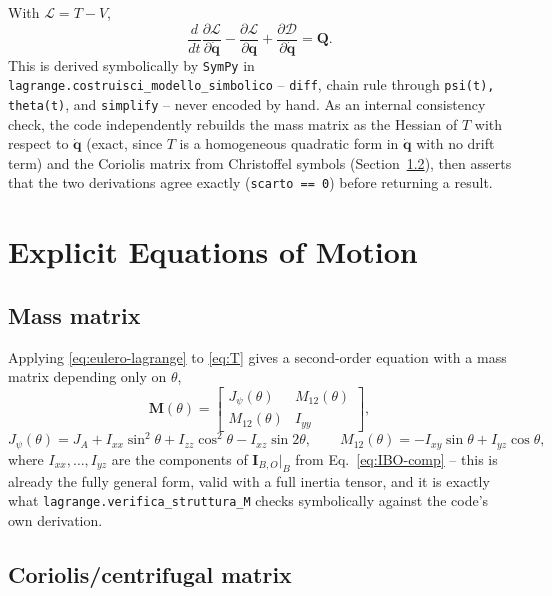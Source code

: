 \documentclass[11pt,a4paper]{article}
\numberwithin{equation}{section}
\newcommand{\bs}[1]{\boldsymbol{#1}}
\begin{document}
With $\mathcal L = T - V$,
\begin{equation}
\frac{d}{dt}\frac{\partial\mathcal L}{\partial\dot{\bs q}} - \frac{\partial\mathcal L}{\partial\bs q} + \frac{\partial\mathcal D}{\partial\dot{\bs q}} = \bs Q .
\label{eq:eulero-lagrange}
\end{equation}
This is derived symbolically by \texttt{SymPy} in \texttt{lagrange.\allowbreak costruisci\_\allowbreak modello\_\allowbreak simbolico} -- \texttt{diff}, chain rule through \texttt{psi(t), theta(t)}, and \texttt{simplify} -- never encoded by hand. As an internal consistency check, the code independently rebuilds the mass matrix as the Hessian of $T$ with respect to $\dot{\bs q}$ (exact, since $T$ is a homogeneous quadratic form in $\dot{\bs q}$ with no drift term) and the Coriolis matrix from Christoffel symbols (Section~\ref{subsec:christoffel}), then asserts that the two derivations agree exactly (\texttt{scarto == 0}) before returning a result.

\section{Explicit Equations of Motion}
\label{sec:eom}

\subsection{Mass matrix}

Applying \eqref{eq:eulero-lagrange} to \eqref{eq:T} gives a second-order equation with a mass matrix depending only on $\theta$,
\begin{equation}
\bs M(\theta) = \begin{bmatrix} J_\psi(\theta) & M_{12}(\theta)\\ M_{12}(\theta) & I_{yy} \end{bmatrix},
\label{eq:M}
\end{equation}
\begin{equation}
J_\psi(\theta) = J_A + I_{xx}\sin^2\theta + I_{zz}\cos^2\theta - I_{xz}\sin2\theta,
\qquad
M_{12}(\theta) = -I_{xy}\sin\theta + I_{yz}\cos\theta ,
\label{eq:Jpsi-M12}
\end{equation}
where $I_{xx},\ldots,I_{yz}$ are the components of $\bs I_{B,O}|_B$ from Eq.~\eqref{eq:IBO-comp} -- this is already the fully general form, valid with a full inertia tensor, and it is exactly what \texttt{lagrange.verifica\_struttura\_M} checks symbolically against the code's own derivation.

\subsection{Coriolis/centrifugal matrix}
\label{subsec:christoffel}
\end{document}
